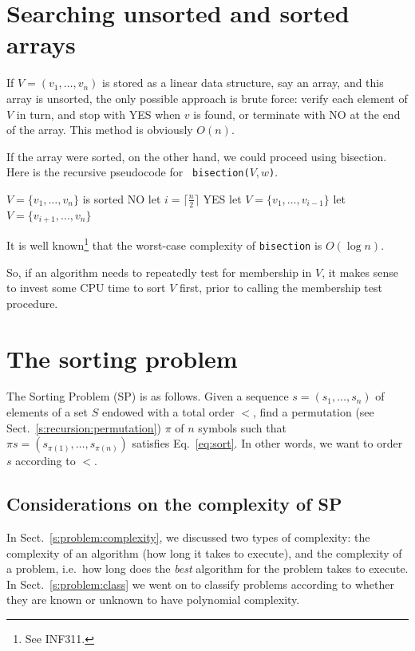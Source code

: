 \documentclass[a4paper]{book}
\theoremstyle{changebreak}                %
\begin{document}
\section{Searching unsorted and sorted arrays}
\label{s:sort:bisection}
If $V=(v_1,\ldots,v_n)$ is stored as a linear data
structure, say an array, and
this array is unsorted, the only
possible approach is brute force: verify each
element of $V$ in turn, and stop with YES when $v$ is found, or
terminate with NO at the end of the array. This method is obviously
$O(n)$.

If the array were sorted, on the
other hand, we could proceed using bisection. Here is
the recursive pseudocode for {\tt
  bisection($V,w$)}.
\begin{algorithmic}[1]
\REQUIRE $V=\{v_1,\ldots,v_n\}$ is sorted
  \RETURN NO
\ENDIF
\STATE let $i=\lceil\frac{n}{2}\rceil$
  \RETURN YES
  \STATE let $V=\{v_{1},\ldots,v_{i-1}\}$
  \STATE let $V=\{v_{i+1},\ldots,v_n\}$
\ENDIF
{}
\end{algorithmic}
It is well known\footnote{See INF311.} that the worst-case complexity
of {\tt bisection} is $O(\log n)$.

So, if an algorithm needs to repeatedly test for membership in $V$, it
makes sense to invest some CPU time to sort $V$ first, prior to
calling the membership test procedure.

\section{The sorting problem}
The {\sc Sorting Problem}
(SP) is as follows. Given a sequence
$s=(s_1,\ldots,s_n)$ of elements of a set $S$ endowed with a total
order $<$, find a permutation
(see Sect.~\ref{s:recursion:permutation}) $\pi$ of $n$ symbols such
that $\pi s=(s_{\pi(1)},\ldots,s_{\pi(n)})$ satisfies
Eq.~\eqref{eq:sort}. In other words, we want to order $s$ according to
$<$.

\subsection{Considerations on the complexity of SP}
In Sect.~\ref{s:problem:complexity}, we discussed two types of
complexity: the complexity of an algorithm
(how long it takes to execute), and the complexity of a
problem, i.e.~how long does the {\it best}
algorithm for the problem takes to execute. In
Sect.~\ref{s:problem:class} we went on to classify problems according
to whether they are known or unknown to have polynomial
complexity. 
\end{document}
